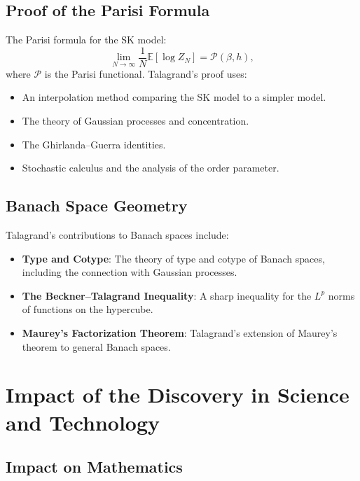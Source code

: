 \subsection{Proof of the Parisi Formula}

The Parisi formula for the SK model:
\[
\lim_{N\to\infty} \frac{1}{N} \mathbb{E}[\log Z_N] = \mathcal{P}(\beta, h),
\]
where $\mathcal{P}$ is the Parisi functional. Talagrand's proof uses:
\begin{itemize}
\item An interpolation method comparing the SK model to a simpler model.
\item The theory of Gaussian processes and concentration.
\item The Ghirlanda--Guerra identities.
\item Stochastic calculus and the analysis of the order parameter.
\end{itemize}

\subsection{Banach Space Geometry}

Talagrand's contributions to Banach spaces include:
\begin{itemize}
\item \textbf{Type and Cotype}: The theory of type and cotype of Banach spaces, including the connection with Gaussian processes.
\item \textbf{The Beckner--Talagrand Inequality}: A sharp inequality for the $L^p$ norms of functions on the hypercube.
\item \textbf{Maurey's Factorization Theorem}: Talagrand's extension of Maurey's theorem to general Banach spaces.
\end{itemize}

\section{Impact of the Discovery in Science and Technology}

\subsection{Impact on Mathematics}

